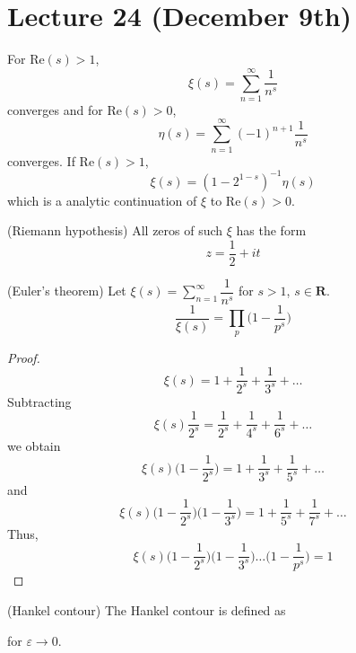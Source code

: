 \section{Lecture 24 (December 9th)}
\begin{recall}
For $\mathrm{Re}(s)>1$, 
\[\xi (s)=\sum _{n=1}^{\infty }\dfrac{1}{n^{s}}\]
converges and for $\mathrm{Re}(s)>0$,
\[\eta (s)=\sum ^{\infty }_{n=1}(-1)^{n+1}\dfrac{1}{n^{s}}\]
converges. If $\mathrm{Re}(s)>1$,
\[\xi (s)=(1-2^{1-s})^{-1}\eta (s)\]
which is a analytic continuation of $\xi $ to $\mathrm{Re}(s)>0$. 
\end{recall}
\vspace{2ex}
\begin{prop}
(Riemann hypothesis) All zeros of such $\xi $ has the form
\[z=\dfrac{1}{2}+it\]
\end{prop}
\vspace{2ex}
\begin{thm}
(Euler's theorem) Let $\xi (s)=\sum _{n=1}^{\infty }\dfrac{1}{n^{s}}$ for $s>1$, $s \in {\bm R}$.
\[\dfrac{1}{\xi (s)}=\prod_{p}\Big(1-\dfrac{1}{p^{s}}\Big)\]
\end{thm}
\vspace{2ex}
\begin{proof}
\[\xi (s)=1+\dfrac{1}{2^{s}}+\dfrac{1}{3^{s}}+\ldots \]
Subtracting
\[\xi (s)\dfrac{1}{2^{s}}=\dfrac{1}{2^{s}}+\dfrac{1}{4^{s}}+\dfrac{1}{6^{s}}+\ldots \]
we obtain
\[\xi (s)\Big(1-\dfrac{1}{2^{s}}\Big)=1+\dfrac{1}{3^{s}}+\dfrac{1}{5^{s}}+\ldots \]
and 
\[\xi (s)\Big(1-\dfrac{1}{2^{s}}\Big)\Big(1-\dfrac{1}{3^{s}}\Big)=1+\dfrac{1}{5^{s}}+\dfrac{1}{7^{s}}+\ldots \]
Thus,
\[\xi (s)\Big(1-\dfrac{1}{2^{s}}\Big)\Big(1-\dfrac{1}{3^{s}}\Big)\ldots \Big(1-\dfrac{1}{p^{s}}\Big)=1\]
\end{proof}
\vspace{2ex}
\begin{defi}
(Hankel contour) The Hankel contour is defined as 
\begin{center}
\end{center}
for $\varepsilon \rightarrow 0$.
\end{defi}
